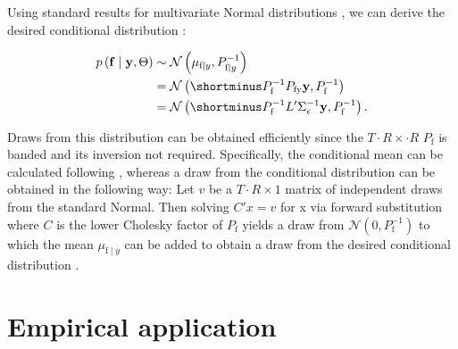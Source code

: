 \documentclass[notitlepage,a4paper,12pt]{article}
\begin{document}
Using standard results for multivariate Normal distributions \citep[e.g.][pp. 86-87]{bishop_prml_2006}, we can derive the desired conditional distribution \citep[see also][eqn. 5]{chanjeliazkov_2009}:

\begin{align}
    p
    \left(
        \mathbf{f} \mid \mathbf{y}, \Theta
     \right) 
    &\sim \mathcal{N}
        \left(
            \mu_{\text{f}\mid y}, P_{\text{f}\mid y}^{-1}
        \right) \\
    &=    
    \mathcal{N}
        \left(
        \shortminus P^{-1}_{\text{f}} P_{\text{fy}} \mathbf{y}, P_{\text{f}}^{-1}
        \right) \\
    &= 
    \mathcal{N}
    \left(
    \shortminus P^{-1}_{\text{f}} L' \Sigma_{\epsilon}^{-1} \mathbf{y}, P_{\text{f}}^{-1}
    \right).
\end{align}

Draws from this distribution can be obtained efficiently since the $T\cdot R \times \cdot R$  $P_{\text{f}}$ is banded and its inversion not required. Specifically, the conditional mean can be calculated following \citet[][Algorithm 5]{rueheld_2005}, whereas a draw from the conditional distribution can be obtained in the following way: Let $v$ be a $T\cdot R \times 1$ matrix of independent draws from the standard Normal. Then solving $C'x = v$ for x via forward substitution where $C$ is the lower Cholesky factor of $P_{\text{f}}$  yields a draw from $\mathcal{N}(0, P^{-1}_{\text{f}})$ to which the mean $\mu_{\text{f}\mid y}$ can be added to obtain a draw from the desired conditional distribution \citep[][Algorithm 4]{rueheld_2005}.

\section{Empirical application}



\end{document}
